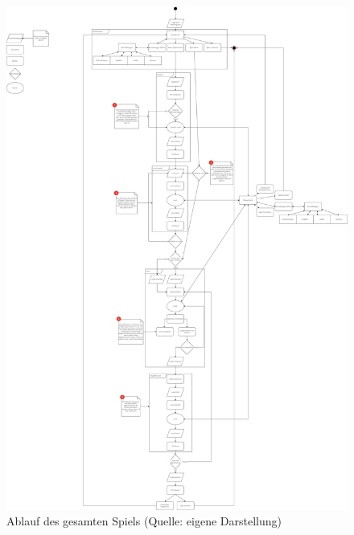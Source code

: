 \begin{figure}[ht]
\centering
\includegraphics[width=0.5\linewidth]{content/pictures/main_loop.jpg}
\caption{Ablauf des gesamten Spiels (Quelle: eigene Darstellung)}
\label{fig:main_loop}
\end{figure}

